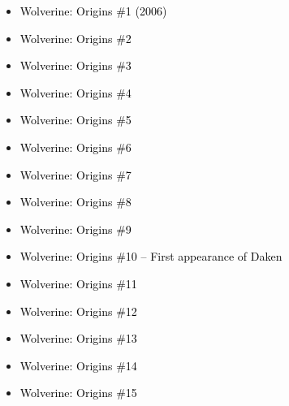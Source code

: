 \documentclass[12pt]{article}
\newcommand{\checkbox}{\raisebox{0.0ex}{\fbox{\rule{0ex}{1.5ex} \rule{1.5ex}{0ex}}}}
\begin{document}
\begin{tcolorbox}[
  colback=white!95!gray, colframe=black,
  width=\textwidth, arc=4mm, auto outer arc,
  boxrule=0.8pt,
  left=8pt,right=8pt,top=8pt,bottom=8pt
]
\begin{itemize}[left=0pt,label={\checkbox}]
  \item \textcolor{black}{Wolverine: Origins \#1 (2006)}
  \item \textcolor{black}{Wolverine: Origins \#2}
  \item \textcolor{black}{Wolverine: Origins \#3}
  \item \textcolor{black}{Wolverine: Origins \#4}
  \item \textcolor{black}{Wolverine: Origins \#5}
  \item \textcolor{black}{Wolverine: Origins \#6}
  \item \textcolor{black}{Wolverine: Origins \#7}
  \item \textcolor{black}{Wolverine: Origins \#8}
  \item \textcolor{black}{Wolverine: Origins \#9}
  \item \textcolor{black}{Wolverine: Origins \#10 – First appearance of Daken}
  \item \textcolor{black}{Wolverine: Origins \#11}
  \item \textcolor{black}{Wolverine: Origins \#12}
  \item \textcolor{black}{Wolverine: Origins \#13}
  \item \textcolor{black}{Wolverine: Origins \#14}
  \item \textcolor{black}{Wolverine: Origins \#15}
\end{itemize}
\end{tcolorbox}
\end{document}
